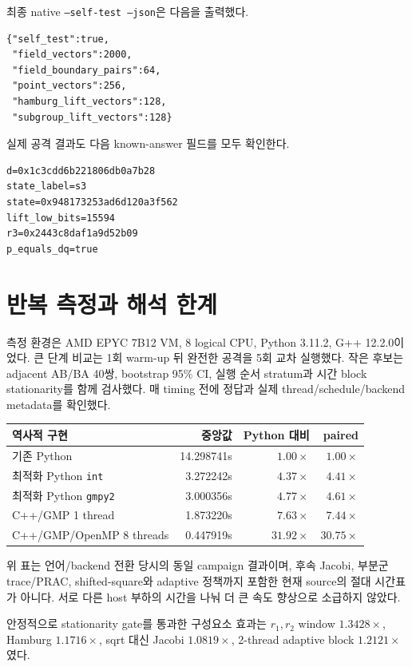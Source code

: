 \documentclass[10pt,a4paper]{article}
\begin{document}
최종 native \texttt{--self-test --json}은 다음을 출력했다.

\begin{lstlisting}
{"self_test":true,
 "field_vectors":2000,
 "field_boundary_pairs":64,
 "point_vectors":256,
 "hamburg_lift_vectors":128,
 "subgroup_lift_vectors":128}
\end{lstlisting}

실제 공격 결과도 다음 known-answer 필드를 모두 확인한다.

\begin{lstlisting}
d=0x1c3cdd6b221806db0a7b28
state_label=s3
state=0x948173253ad6d120a3f562
lift_low_bits=15594
r3=0x2443c8daf1a9d52b09
p_equals_dq=true
\end{lstlisting}

\section{반복 측정과 해석 한계}

측정 환경은 AMD EPYC 7B12 VM, 8 logical CPU, Python 3.11.2,
G++ 12.2.0이었다. 큰 단계 비교는 1회 warm-up 뒤 완전한 공격을 5회
교차 실행했다. 작은 후보는 adjacent AB/BA 40쌍, bootstrap 95\% CI,
실행 순서 stratum과 시간 block stationarity를 함께 검사했다. 매 timing
전에 정답과 실제 thread/schedule/backend metadata를 확인했다.

\begin{tabularx}{\linewidth}{@{}Xrrr@{}}
\toprule
역사적 구현 & 중앙값 & Python 대비 & paired\\
\midrule
기존 Python & 14.298741s & \(1.00\times\) & \(1.00\times\)\\
최적화 Python \texttt{int} & 3.272242s & \(4.37\times\) & \(4.41\times\)\\
최적화 Python \texttt{gmpy2} & 3.000356s & \(4.77\times\) & \(4.61\times\)\\
C++/GMP 1 thread & 1.873220s & \(7.63\times\) & \(7.44\times\)\\
C++/GMP/OpenMP 8 threads & 0.447919s & \(31.92\times\) & \(30.75\times\)\\
\bottomrule
\end{tabularx}

위 표는 언어/backend 전환 당시의 동일 campaign 결과이며, 후속 Jacobi,
부분군 trace/PRAC, shifted-square와 adaptive 정책까지 포함한 현재
source의 절대 시간표가 아니다. 서로 다른 host 부하의 시간을 나눠 더 큰
속도 향상으로 소급하지 않았다.

안정적으로 stationarity gate를 통과한 구성요소 효과는
\(r_1,r_2\) window \(1.3428\times\),
Hamburg \(1.1716\times\), sqrt 대신 Jacobi \(1.0819\times\),
2-thread adaptive block \(1.2121\times\)였다.
\end{document}

